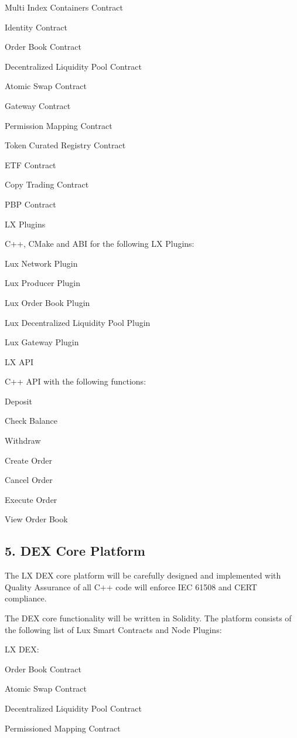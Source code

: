 \documentclass[11pt]{article}
\begin{document}
Multi Index Containers Contract


Identity Contract


Order Book Contract


Decentralized Liquidity Pool Contract


Atomic Swap Contract


Gateway Contract


Permission Mapping Contract


Token Curated Registry Contract


ETF Contract


Copy Trading Contract


PBP Contract


LX Plugins


C++, CMake and ABI for the following LX Plugins:


Lux Network Plugin


Lux Producer Plugin


Lux Order Book Plugin


Lux Decentralized Liquidity Pool Plugin


Lux Gateway Plugin


LX API


C++ API with the following functions:


Deposit


Check Balance


Withdraw


Create Order


Cancel Order


Execute Order


View Order Book


\subsection{5. DEX Core Platform}

The LX DEX core platform will be carefully designed and implemented with Quality Assurance of all C++ code will enforce IEC 61508 and CERT compliance.


The DEX core functionality will be written in Solidity. The platform consists of the following list of Lux  Smart Contracts and Node Plugins:


LX DEX:


Order Book Contract


Atomic Swap Contract


Decentralized Liquidity Pool Contract


Permissioned Mapping Contract
\end{document}
